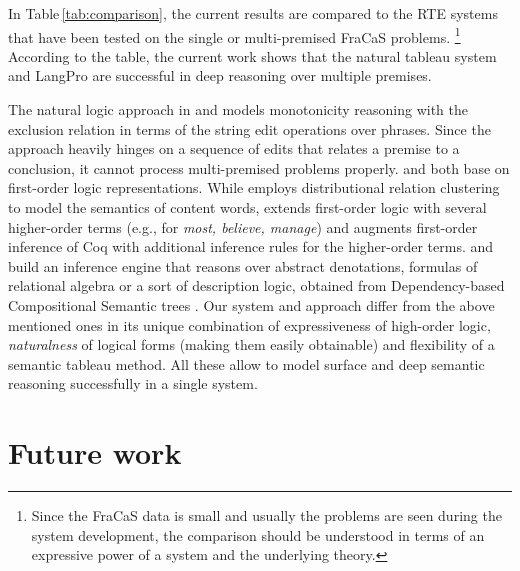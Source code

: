 \documentclass[11pt]{article}
\newcommand{\T}{\mathbb{T}}
\begin{document}
%
%



In Table\,\ref{tab:comparison}, the current results are compared to the RTE systems that have been tested on the single or multi-premised FraCaS problems.%
%
\footnote{
Since the FraCaS data is small and usually the problems are seen during the system development, the comparison should be understood in terms of an expressive power of a system and the underlying theory.
}
According to the table, the current work shows that the natural tableau system and LangPro are successful in deep reasoning over multiple premises. 

The natural logic approach in  and   models monotonicity reasoning with the exclusion relation in terms of the string edit operations over phrases.
Since the approach heavily hinges on a sequence of edits that relates a premise to a conclusion, it cannot process multi-premised problems properly.
 and  both base on first-order logic representations.
While  employs distributional relation clustering to model the semantics of content words,  extends first-order logic with several higher-order terms (e.g., for {\em most, believe, manage}) and augments first-order inference of Coq with additional inference rules for the higher-order terms. 
 and  build an inference engine that reasons over abstract denotations, formulas of relational algebra or a sort of description logic, obtained from Dependency-based Compositional Semantic trees \cite{liang11dcs}.
Our system and approach differ from the above mentioned ones in its unique combination of expressiveness of high-order logic, {\em naturalness} of logical forms (making them easily obtainable) and flexibility of a semantic tableau method.
All these allow to model surface and deep semantic reasoning successfully in a single system.       




\section{Future work}
\label{FW}
\end{document}
